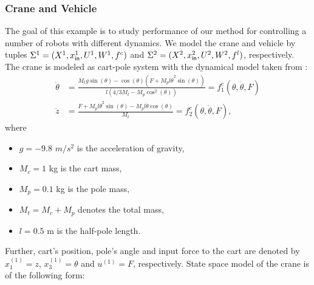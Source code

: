 \subsubsection{Crane and Vehicle}
\label{subsec}
The goal of this example is to study performance of our method for controlling a number of robots with different dynamics. %
We model the crane and vehicle by tuples $\Sigma^1=(X^1,x_{\mathsf{in}}^1,U^1,W^1,f^c)$ and $\Sigma^2=(X^2,x_{\mathsf{in}}^2,U^2,W^2,f^l)$, respectively. The crane is modeled as cart-pole system with the dynamical model taken from \cite{Barto1983}:
\begin{align*}
	\ddot{\theta} &= \frac{M_tg\sin(\theta) - \cos(\theta)(F + M_pl \dot{\theta}^2 \sin(\theta))}{l(4/3 M_t- M_p \cos^2(\theta))}=f^c_1(\theta,\dot{\theta},F)\\
	\ddot{z}&= \frac{F + M_pl \dot{\theta}^2 \sin(\theta)-M_pl \ddot{\theta} \cos(\theta)}{M_t}=f^c_2(\theta,\dot{\theta},F),
\end{align*}
where
\begin{itemize}
	\item[] $g=-9.8$ $m/s^2$ is the acceleration of gravity,
	\item[] $M_c=1$ kg is the cart mass,
	\item[] $M_p=0.1$ kg is the pole mass,
	\item[] $M_t=M_c+M_p$ denotes the total mass,
	\item[] $l=0.5$ m is the half-pole length.
\end{itemize}
Further, cart's position, pole's angle and input force to the cart are denoted by $x_1^{(1)}=z$, $x_3^{(1)}=\theta$ and $u^{(1)}=F$, respectively. State space model of the crane is of the following form:
